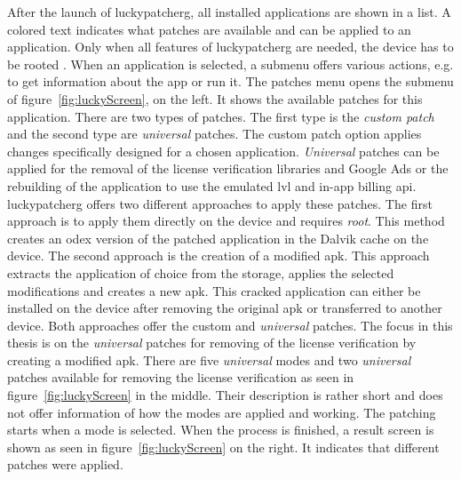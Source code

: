 After the launch of \gls{luckypatcherg}, all installed applications are shown in a list.
A colored text indicates what patches are available and can be applied to an application.
Only when all features of \gls{luckypatcherg} are needed, the device has to be rooted \cite{luckyPatcherOfficial}.
\newline
When an application is selected, a submenu offers various actions, e.g. to get information about the app or run it.
The patches menu opens the submenu of figure~\ref{fig:luckyScreen}, on the left.
It shows the available patches for this application.
\newline
There are two types of patches.
The first type is the \textit{custom patch} and the second type are \textit{universal} patches.
The custom patch option applies changes specifically designed for a chosen application.
\newline
\textit{Universal} patches can be applied for the removal of the license verification libraries and Google Ads or the rebuilding of the application to use the emulated \gls{lvl} and in-app billing \gls{api}.
\newline
\gls{luckypatcherg} offers two different approaches to apply these patches.
The first approach is to apply them directly on the device and requires \textit{root}.
This method creates an \gls{odex} version of the patched application in the Dalvik cache on the device.
The second approach is the creation of a modified \gls{apk}.
This approach extracts the application of choice from the storage, applies the selected modifications and creates a new \gls{apk}.
This cracked application can either be installed on the device after removing the original \gls{apk} or transferred to another device.
\newline
Both approaches offer the custom and \textit{universal} patches.
\newline
\newline
The focus in this thesis is on the \textit{universal} patches for removing of the license verification by creating a modified \gls{apk}.
\newline
There are five \textit{universal} modes and two \textit{universal} patches available for removing the license verification as seen in figure~\ref{fig:luckyScreen} in the middle.
Their description is rather short and does not offer information of how the modes are applied and working.
\newline
The patching starts when a mode is selected.
When the process is finished, a result screen is shown as seen in figure~\ref{fig:luckyScreen} on the right.
It indicates that different patches were applied.
